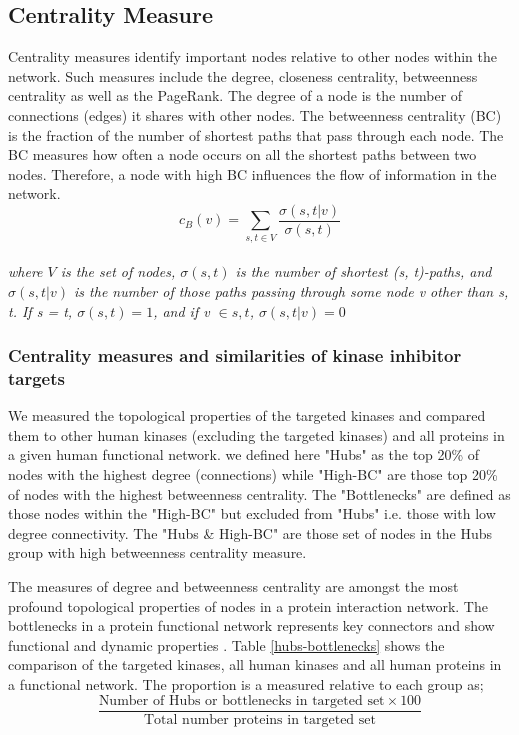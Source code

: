 \documentclass[a4paper, 11pt]{article}
\begin{document}
\subsection*{Centrality Measure}
Centrality measures identify important nodes relative to other nodes within the network. Such measures include the degree, closeness centrality, betweenness centrality as well as the PageRank. The degree of a node is the number of connections (edges) it shares with other nodes. The betweenness centrality (BC) is the fraction of the number of shortest paths that pass through each node. The BC measures how often a node occurs on all the shortest paths between two nodes. Therefore, a node with high BC influences the flow of information in the network. \[c_B(v) =\sum_{s,t \in V} \frac{\sigma(s, t|v)}{\sigma(s, t)}\]\\
\textit{where $V$ is the set of nodes, $\sigma(s, t)$ is the number of shortest (s, t)-paths, and $\sigma(s, t|v)$ is the number of those paths passing through some node v other than s, t. If s = t, $\sigma(s, t) = 1$, and if v $\in {s, t}$, $\sigma(s, t|v) = 0$}

\subsubsection*{Centrality measures and similarities of kinase inhibitor targets}
We measured the topological properties of the targeted kinases and compared them to other human kinases (excluding the targeted kinases) and all proteins in a given human functional network. we defined here "Hubs" as the top 20\% of nodes with the highest degree (connections) while "High-BC" are those top 20\% of nodes with the highest betweenness centrality. The "Bottlenecks" are defined as those nodes within the "High-BC" but excluded from "Hubs" i.e. those with low degree connectivity. The "Hubs \& High-BC" are those set of nodes in the Hubs group with high betweenness centrality measure. \par
The measures of degree and betweenness centrality are amongst the most profound topological properties of nodes in a protein interaction network. The bottlenecks in a protein functional network represents key connectors and show functional and dynamic properties \cite{yu2007importance}. Table \ref{hubs-bottlenecks} shows the comparison of the targeted kinases, all human kinases and all human proteins in a functional network. The proportion is a measured relative to each group as; 
\[
\frac{\text{Number of Hubs or bottlenecks in targeted set} \times100 } {\text{Total number proteins in targeted set}}
\]
\end{document}
